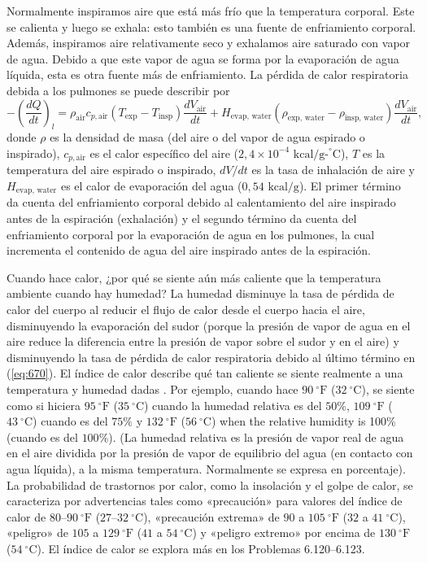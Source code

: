 \documentclass[12pt]{book}
\begin{document}
Normalmente inspiramos aire que está más frío que la temperatura corporal. Este se calienta y luego se exhala: esto también es una fuente de enfriamiento corporal. Además, inspiramos aire relativamente seco y exhalamos aire saturado con vapor de agua. Debido a que este vapor de agua se forma por la evaporación de agua líquida, esta es otra fuente más de enfriamiento. La pérdida de calor respiratoria debida a los pulmones se puede describir por
\begin{equation}
-\left(\frac{dQ}{dt}\right)_l = \rho_{\text{air}} c_{p, \text{air}} (T_{\text{exp}} - T_{\text{insp}}) \frac{dV_{\text{air}}}{dt} + H_{\text{evap, water}} (\rho_{\text{exp, water}} - \rho_{\text{insp, water}}) \frac{dV_{\text{air}}}{dt},
\label{eq:670}
\end{equation}
donde $\rho$ es la densidad de masa (del aire o del vapor de agua espirado o inspirado), $c_{p, \text{air}}$ es el calor específico del aire ($2{,}4 \times 10^{-4}\text{ kcal/g-}^\circ\text{C}$), $T$ es la temperatura del aire espirado o inspirado, $dV/dt$ es la tasa de inhalación de aire y $H_{\text{evap, water}}$ es el calor de evaporación del agua ($0{,}54\text{ kcal/g}$). El primer término da cuenta del enfriamiento corporal debido al calentamiento del aire inspirado antes de la espiración (exhalación) y el segundo término da cuenta del enfriamiento corporal por la evaporación de agua en los pulmones, la cual incrementa el contenido de agua del aire inspirado antes de la espiración.

Cuando hace calor, ¿por qué se siente aún más caliente que la temperatura ambiente cuando hay humedad? La humedad disminuye la tasa de pérdida de calor del cuerpo al reducir el flujo de calor desde el cuerpo hacia el aire, disminuyendo la evaporación del sudor (porque la presión de vapor de agua en el aire reduce la diferencia entre la presión de vapor sobre el sudor y en el aire) y disminuyendo la tasa de pérdida de calor respiratoria debido al último término en (\ref{eq:670}). El índice de calor describe qué tan caliente se siente realmente a una temperatura y humedad dadas \cite{96,97}. Por ejemplo, cuando hace $90\ ^\circ\text{F}$ ($32\ ^\circ\text{C}$), se siente como si hiciera $95\ ^\circ\text{F}$ ($35\ ^\circ\text{C}$) cuando la humedad relativa es del $50\%$, $109\ ^\circ\text{F}$ ($43\ ^\circ\text{C}$) cuando es del $75\%$ y $132\ ^\circ\text{F}$ ($56\ ^\circ\text{C}$) when the relative humidity is 100\% (cuando es del $100\%$). (La humedad relativa es la presión de vapor real de agua en el aire dividida por la presión de vapor de equilibrio del agua (en contacto con agua líquida), a la misma temperatura. Normalmente se expresa en porcentaje). La probabilidad de trastornos por calor, como la insolación y el golpe de calor, se caracteriza por advertencias tales como «precaución» para valores del índice de calor de $80\text{--}90\ ^\circ\text{F}$ ($27\text{--}32\ ^\circ\text{C}$), «precaución extrema» de $90$ a $105\ ^\circ\text{F}$ ($32$ a $41\ ^\circ\text{C}$), «peligro» de $105$ a $129\ ^\circ\text{F}$ ($41$ a $54\ ^\circ\text{C}$) y «peligro extremo» por encima de $130\ ^\circ\text{F}$ ($54\ ^\circ\text{C}$). El índice de calor se explora más en los Problemas 6.120--6.123.
\end{document}
